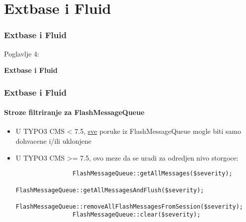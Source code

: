 %

\section{Extbase i Fluid}
\begin{frame}[fragile]
	\frametitle{Extbase i Fluid}

	\begin{center}\huge{Poglavlje 4:}\end{center}
	\begin{center}\huge{\color{typo3darkgrey}\textbf{Extbase i Fluid}}\end{center}

\end{frame}


\begin{frame}[fragile]
	\frametitle{Extbase i Fluid}
	\framesubtitle{Stroze filtriranje za FlashMessageQueue}

	\begin{itemize}

		\item U TYPO3 CMS < 7.5, \underline{sve} poruke iz FlashMessageQueue mogle biti samo dohvacene i/ili uklonjene

		\item U TYPO3 CMS >= 7.5, ovo meze da se uradi za odredjen nivo storgoce:

			\begin{lstlisting}
				FlashMessageQueue::getAllMessages($severity);
				FlashMessageQueue::getAllMessagesAndFlush($severity);
				FlashMessageQueue::removeAllFlashMessagesFromSession($severity);
				FlashMessageQueue::clear($severity);
			\end{lstlisting}

	\end{itemize}

\end{frame}

